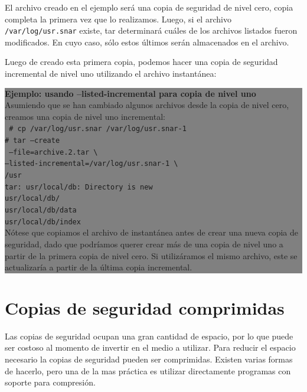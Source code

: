 \documentclass[12pt]{article}
\begin{document}
El archivo creado en el ejemplo será una copia de seguridad de nivel cero, 
copia completa la primera vez que lo realizamos. Luego, si el archivo
{\tt /var/log/usr.snar} existe, tar determinará cuáles de los archivos 
listados fueron modificados. En cuyo caso, sólo estos últimos serán 
almacenados en el archivo. 

Luego de creado esta primera copia, podemos hacer una copia de seguridad
incremental de nivel uno utilizando el archivo instantánea: 


\colorbox{grey}{\parbox[t]{0.95\linewidth}{ \vspace*{0.5cm} { 
{\bf Ejemplo: usando --listed-incremental para copia de nivel uno } \\
Asumiendo que se han cambiado algunos archivos desde la copia de nivel 
cero, creamos una copia de nivel uno incremental: \\
{\tt
\# cp /var/log/usr.snar /var/log/usr.snar-1 	\\
\# tar --create \\\
           --file=archive.2.tar \textbackslash \\
           --listed-incremental=/var/log/usr.snar-1 \textbackslash \\
           /usr\\
tar: usr/local/db: Directory is new\\
usr/local/db/\\
usr/local/db/data\\
usr/local/db/index\\
}
Nótese que copiamos el archivo de instantánea antes de crear una nueva 
copia de seguridad, dado que podríamos querer crear más de una copia 
de nivel uno a partir de la primera copia de nivel cero. Si utilizáramos 
el mismo archivo, este se actualizaría a partir de la última copia 
incremental. 
} \vspace*{0.5cm} } } 



\section*{Copias de seguridad comprimidas}

Las copias de seguridad ocupan una gran cantidad de espacio, por lo que
puede ser costoso al momento de invertir en el medio a utilizar.
Para reducir el espacio necesario la copias de seguridad pueden ser 
comprimidas.  Existen varias formas de hacerlo, pero una de la mas práctica 
es utilizar directamente programas con soporte para compresión.
\end{document}
